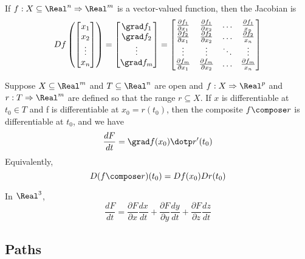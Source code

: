 \begin{definition}[Jacobian]
  If $f: X \subseteq \Real^n \Rightarrow \Real^m$ is a vector-valued function, then the Jacobian is
  \[
    Df\left(\begin{bmatrix}
      x_1 \\
      x_2 \\
      \vdots \\
      x_n
    \end{bmatrix}\right) = \begin{bmatrix}
      \grad f_1 \\
      \grad f_2 \\
      \vdots \\
      \grad f_m
    \end{bmatrix} = \begin{bmatrix}
      \frac{\partial f_1}{\partial x_1} & \frac{\partial f_1}{\partial x_2} & \hdots & \frac{\partial f_1}{x_n} \\
      \frac{\partial f_2}{\partial x_1} & \frac{\partial f_2}{\partial x_2} & \hdots & \frac{\partial f_2}{x_n} \\
      \vdots & \vdots & \ddots & \vdots \\
      \frac{\partial f_m}{\partial x_1} & \frac{\partial f_m}{\partial x_2} & \hdots & \frac{\partial f_m}{x_n} \\
    \end{bmatrix}
  \]
\end{definition}

\begin{theorem}
  Suppose $X \subseteq \Real^m$ and $T \subseteq \Real^n$ are open and $f : X \Rightarrow \Real^p$ and
  $r : T \Rightarrow \Real^m$ are defined so that the range $r \subseteq X$. If $x$ is
  differentiable at $t_0 \in T$ and f is differentiable at $x_0 = r(t_0)$, then
  the composite $f \compose r$ is differentiable at $t_0$, and we have
  \[
    \frac{dF}{dt} = \grad f(x_0) \dotp r'(t_0)
  \]
  Equivalently,
  \[
    D(f \compose r)(t_0) = Df(x_0) Dr(t_0)
  \]

  In $\Real^3$,
  \[
    \frac{dF}{dt} = \frac{\partial F}{\partial x} \frac{dx}{dt} + \frac{\partial F}{\partial y} \frac{dy}{dt} + \frac{\partial F}{\partial z} \frac{dz}{dt}
  \]
\end{theorem}

\subsection{Paths}

